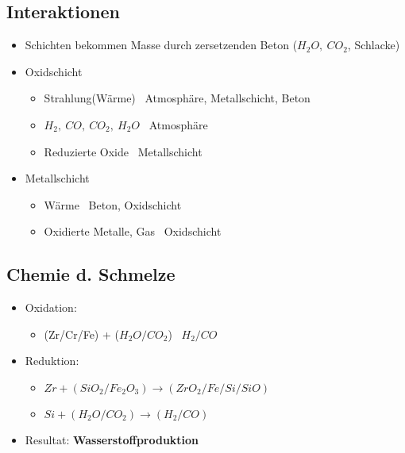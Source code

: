 \documentclass[12pt]{article}
\begin{document}
\subsection{Interaktionen}
\begin{itemize}
	\item Schichten bekommen Masse durch zersetzenden Beton (\(H_2O,\ CO_2\), Schlacke)
	\item Oxidschicht
		\begin{itemize}
			\item Strahlung(Wärme) \textrightarrow\ Atmosphäre, Metallschicht, Beton
			\item \(H_2,\ CO,\ CO_2,\ H_2O\) \textrightarrow\ Atmosphäre
			\item Reduzierte Oxide \textrightarrow\ Metallschicht
		\end{itemize}
	\item Metallschicht
		\begin{itemize}
			\item Wärme \textrightarrow\ Beton, Oxidschicht
			\item Oxidierte Metalle, Gas \textrightarrow\ Oxidschicht
		\end{itemize}
\end{itemize}

\subsection{Chemie d. Schmelze}
\begin{itemize}
	\item Oxidation:
		\begin{itemize}
			\item (Zr/Cr/Fe) + (\(H_2O/CO_2\)) \textrightarrow\ \(H_2/CO\)
		\end{itemize}
	\item Reduktion:
		\begin{itemize}
			\item \(Zr + (SiO_2/Fe_2O_3) \rightarrow (ZrO_2/Fe/Si/SiO)\)
			\item \(Si + (H_2O/CO_2) \rightarrow (H_2/CO)\)
		\end{itemize}
	\item Resultat: \textbf{Wasserstoffproduktion}
\end{itemize}
\end{document}
